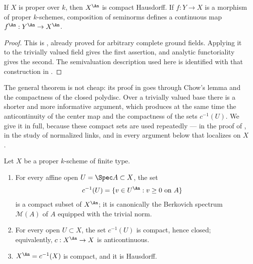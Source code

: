 \begin{theorem}\label{thm:triv-berkovich-compactness}
If $X$ is proper over $k$, then $X^{\An}$ is compact Hausdorff.  If
$f:Y\to X$ is a morphism of proper $k$-schemes, composition of
seminorms defines a continuous map $f^{\An}:Y^{\An}\to X^{\An}$.
\end{theorem}

\begin{proof}
This is , already proved for arbitrary
complete ground fields.  Applying it to the trivially valued field gives the
first assertion, and analytic functoriality gives the second.  The
semivaluation description used here is identified with that construction in
\cite[\S1.1]{BJ22}.
\end{proof}

The general theorem is not cheap: its proof in
 goes through Chow's lemma and the compactness
of the closed polydisc.  Over a trivially valued base there is a shorter and
more informative argument, which produces at the same time the anticontinuity
of the center map and the compactness of the sets $c^{-1}(U)$.  We give it
in full, because these compact sets are used repeatedly --- in the proof of
, in the study of normalized links, and in
every argument below that localizes on $X$.

\begin{theorem}
\label{thm:ch32-center-compact}
Let $X$ be a proper $k$-scheme of finite type.
\begin{enumerate}
\item\label{itm:ch32-cc:affine}
For every affine open $U=\Spec A\subset X$, the set
\[
 c^{-1}(U)=\{v\in U^{\An}:v\geq0\text{ on }A\}
\]
is a compact subset of $X^{\An}$; it is canonically the Berkovich spectrum
$\mathcal M(A)$ of $A$ equipped with the trivial norm.
\item\label{itm:ch32-cc:general}
For every open $U\subset X$, the set $c^{-1}(U)$ is compact, hence
closed; equivalently, $c:X^{\An}\to X$ is anticontinuous.
\item\label{itm:ch32-cc:compact}
$X^{\An}=c^{-1}(X)$ is compact, and it is Hausdorff.
\end{enumerate}
\end{theorem}

